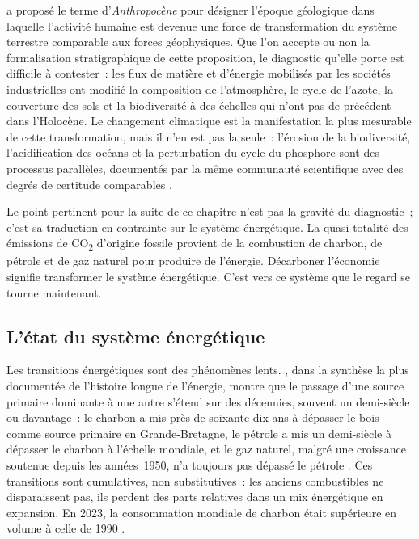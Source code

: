 \textcite{crutzen_geology_2002} a proposé le terme d'\emph{Anthropocène} pour désigner l'époque géologique dans laquelle l'activité humaine est devenue une force de transformation du système terrestre comparable aux forces géophysiques. Que l'on accepte ou non la formalisation stratigraphique de cette proposition, le diagnostic qu'elle porte est difficile à contester~: les flux de matière et d'énergie mobilisés par les sociétés industrielles ont modifié la composition de l'atmosphère, le cycle de l'azote, la couverture des sols et la biodiversité à des échelles qui n'ont pas de précédent dans l'Holocène. Le changement climatique est la manifestation la plus mesurable de cette transformation, mais il n'en est pas la seule~: l'érosion de la biodiversité, l'acidification des océans et la perturbation du cycle du phosphore sont des processus parallèles, documentés par la même communauté scientifique avec des degrés de certitude comparables \parencite{rockstrom_safe_2009, steffen_planetary_2015}.

Le point pertinent pour la suite de ce chapitre n'est pas la gravité du diagnostic~; c'est sa traduction en contrainte sur le système énergétique. La quasi-totalité des émissions de CO\textsubscript{2} d'origine fossile provient de la combustion de charbon, de pétrole et de gaz naturel pour produire de l'énergie. Décarboner l'économie signifie transformer le système énergétique. C'est vers ce système que le regard se tourne maintenant.


\subsection{L'état du système énergétique}\label{subsec:energie}

Les transitions énergétiques sont des phénomènes lents. \textcite{smil_energy_2017}, dans la synthèse la plus documentée de l'histoire longue de l'énergie, montre que le passage d'une source primaire dominante à une autre s'étend sur des décennies, souvent un demi-siècle ou davantage~: le charbon a mis près de soixante-dix ans à dépasser le bois comme source primaire en Grande-Bretagne, le pétrole a mis un demi-siècle à dépasser le charbon à l'échelle mondiale, et le gaz naturel, malgré une croissance soutenue depuis les années~1950, n'a toujours pas dépassé le pétrole \parencite{smil_energy_2010}. Ces transitions sont cumulatives, non substitutives~: les anciens combustibles ne disparaissent pas, ils perdent des parts relatives dans un mix énergétique en expansion. En 2023, la consommation mondiale de charbon était supérieure en volume à celle de 1990 \parencite{iea_weo_2024}.

